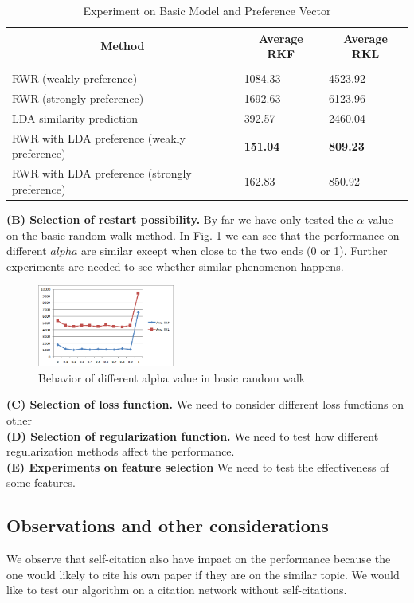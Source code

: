 \documentclass{article} %
\begin{document}
\begin{table}[t]
\caption{Experiment on Basic Model and Preference Vector}
\label{results-table}
\begin{center}
\begin{tabular}{lll}
\multicolumn{1}{c}{\bf Method}  &\multicolumn{1}{c}{\bf Average RKF} &\multicolumn{1}{c}{\bf Average RKL}
\\ \hline \\
RWR (weakly preference) &1084.33 &4523.92\\
RWR (strongly preference) &1692.63 &6123.96\\
LDA similarity prediction &392.57 &2460.04\\
RWR with LDA preference (weakly preference) &\textbf{151.04} &\textbf{809.23}\\
RWR with LDA preference (strongly preference) &162.83 &850.92\\
\end{tabular}
\end{center}
\end{table}
\textbf{(B) Selection of restart possibility.}
By far we have only tested the $\alpha$ value on the basic random walk method. In Fig. \ref{fig:evalAlpha} we can see that the performance on different $alpha$ are similar except when close to the two ends (0 or 1). Further experiments are needed to see whether similar phenomenon happens.\\ 
\begin{figure}[htb]
\centering
\includegraphics[width=0.4\textwidth]{evalAlpha}
\caption{Behavior of different alpha value in basic random walk}
\label{fig:evalAlpha}
\end{figure}
\textbf{(C) Selection of loss function.}
We need to consider different loss functions on other \\
\textbf{(D) Selection of regularization function.}
We need to test how different regularization methods affect the performance.\\
\textbf{(E) Experiments on feature selection}
We need to test the effectiveness of some features.
\subsection{Observations and other considerations}
We observe that self-citation also have impact on the performance because the one would likely to cite his own paper if they are on the similar topic. We would like to test our algorithm on a citation network without self-citations.
\end{document}

